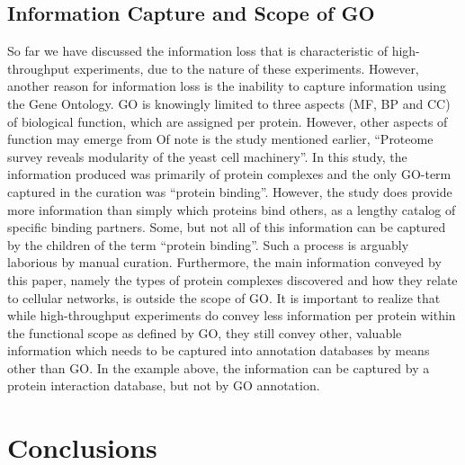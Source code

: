 \documentclass[12pt]{article}
\begin{document}
\subsection*{Information Capture and Scope of GO}

So far we have discussed the information loss that is characteristic of high-throughput
experiments, due to the nature of these experiments. However, another reason for information loss
is the inability to capture information using the Gene Ontology. GO is knowingly limited to three
aspects (MF, BP and CC) of biological function, which are assigned per protein. However, other
aspects of function may emerge from 
Of note
is the study mentioned earlier, ``Proteome survey reveals modularity of the yeast cell
machinery''\cite{18029348}.  In this study, the information produced was primarily of protein
complexes and the only GO-term captured in the curation was ``protein binding''.  However, the
study does provide more information than simply which proteins bind others, as  a lengthy catalog
of specific binding partners. Some, but not all of this information can be captured by the
children of the term ``protein binding''. Such a process is arguably laborious by manual
curation. Furthermore, the main information conveyed by this paper, namely the types of protein
complexes discovered and how they relate to cellular networks, is outside the scope of GO. It is
important to realize that while high-throughput experiments do convey less information per
protein within the functional scope as defined by GO, they still convey other, valuable
information which needs to be captured into annotation databases by means other than GO. In the
example above, the information can be captured by a protein interaction database, but not by GO
annotation.

\section*{Conclusions}
\end{document}
